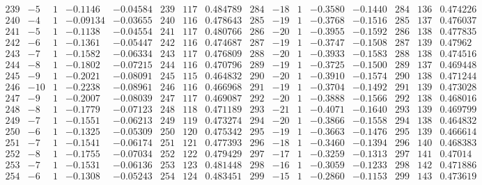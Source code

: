 \documentclass[11pt,reqno,a4letter]{article}
\numberwithin{figure}{section}
\numberwithin{table}{section}
\theoremstyle{plain}
\numberwithin{theorem}{section}
\theoremstyle{definition}
\begin{document}
\begin{table}[ht!]
\begin{equation*}
{\begin{array}{ccccc|ccc|ccccc|ccc}
 239 & -5 & 1 & -0.1146 & -0.04584 & 239 & 117 & 0.484789 & 284 & -18 & 1 & -0.3580 & -0.1440 & 284 & 136 & 0.474226 \\
 240 & -4 & 1 & -0.09134 & -0.03655 & 240 & 116 & 0.478643 & 285 & -19 & 1 & -0.3768 & -0.1516 & 285 & 137 & 0.476037 \\
 241 & -5 & 1 & -0.1138 & -0.04554 & 241 & 117 & 0.480766 & 286 & -20 & 1 & -0.3955 & -0.1592 & 286 & 138 & 0.477835 \\
 242 & -6 & 1 & -0.1361 & -0.05447 & 242 & 116 & 0.474687 & 287 & -19 & 1 & -0.3747 & -0.1508 & 287 & 139 & 0.47962 \\
 243 & -7 & 1 & -0.1582 & -0.06334 & 243 & 117 & 0.476809 & 288 & -20 & 1 & -0.3933 & -0.1583 & 288 & 138 & 0.474516 \\
 244 & -8 & 1 & -0.1802 & -0.07215 & 244 & 116 & 0.470796 & 289 & -19 & 1 & -0.3725 & -0.1500 & 289 & 137 & 0.469448 \\
 245 & -9 & 1 & -0.2021 & -0.08091 & 245 & 115 & 0.464832 & 290 & -20 & 1 & -0.3910 & -0.1574 & 290 & 138 & 0.471244 \\
 246 & -10 & 1 & -0.2238 & -0.08961 & 246 & 116 & 0.466968 & 291 & -19 & 1 & -0.3704 & -0.1492 & 291 & 139 & 0.473028 \\
 247 & -9 & 1 & -0.2007 & -0.08039 & 247 & 117 & 0.469087 & 292 & -20 & 1 & -0.3888 & -0.1566 & 292 & 138 & 0.468016 \\
 248 & -8 & 1 & -0.1779 & -0.07123 & 248 & 118 & 0.471189 & 293 & -21 & 1 & -0.4071 & -0.1640 & 293 & 139 & 0.469799 \\
 249 & -7 & 1 & -0.1551 & -0.06213 & 249 & 119 & 0.473274 & 294 & -20 & 1 & -0.3866 & -0.1558 & 294 & 138 & 0.464832 \\
 250 & -6 & 1 & -0.1325 & -0.05309 & 250 & 120 & 0.475342 & 295 & -19 & 1 & -0.3663 & -0.1476 & 295 & 139 & 0.466614 \\
 251 & -7 & 1 & -0.1541 & -0.06174 & 251 & 121 & 0.477393 & 296 & -18 & 1 & -0.3460 & -0.1394 & 296 & 140 & 0.468383 \\
 252 & -8 & 1 & -0.1755 & -0.07034 & 252 & 122 & 0.479429 & 297 & -17 & 1 & -0.3259 & -0.1313 & 297 & 141 & 0.47014 \\
 253 & -7 & 1 & -0.1531 & -0.06136 & 253 & 123 & 0.481448 & 298 & -16 & 1 & -0.3059 & -0.1233 & 298 & 142 & 0.471886 \\
 254 & -6 & 1 & -0.1308 & -0.05243 & 254 & 124 & 0.483451 & 299 & -15 & 1 & -0.2860 & -0.1153 & 299 & 143 & 0.473619 \\
\end{array}
}
\end{equation*} 


\end{table}
\end{document}
